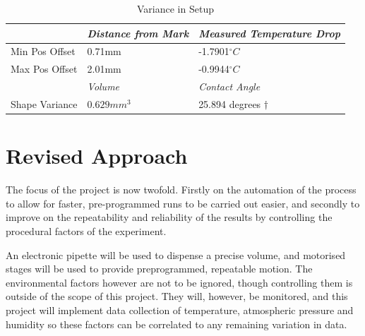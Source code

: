 \begin{table}[h]
    \centering
    \begin{tabular}{|l|l|l|}
    \hline
                   & \textit{Distance from Mark}          & \textit{Measured Temperature Drop} \\ \hline
    Min Pos Offset & 0.71mm                     &-1.7901$^{\circ}C$    \\ \hline
    Max Pos Offset &       2.01mm    &  -0.9944$^{\circ}C$    \\ \hline
                   & \textit{Volume}            & \textit{Contact Angle}          \\ \hline
    Shape Variance & $0.629mm^3$ & 25.894 degrees $\dagger$                \\ \hline
    \end{tabular}
    \caption{Variance in Setup}
    \end{table}


\section{Revised Approach}
The focus of the project is now twofold. Firstly on the automation of the process to allow for faster, pre-programmed runs to be carried out easier, and secondly to improve on the repeatability and reliability of the results by controlling the procedural factors of the experiment. 

An electronic pipette will be used to dispense a precise volume, and motorised stages will be used to provide preprogrammed, repeatable motion. The environmental factors however are not to be ignored, though controlling them is outside of the scope of this project. They will, however, be monitored, and this project will implement data collection of temperature, atmospheric pressure and humidity so these factors can be correlated to any remaining variation in data.  
